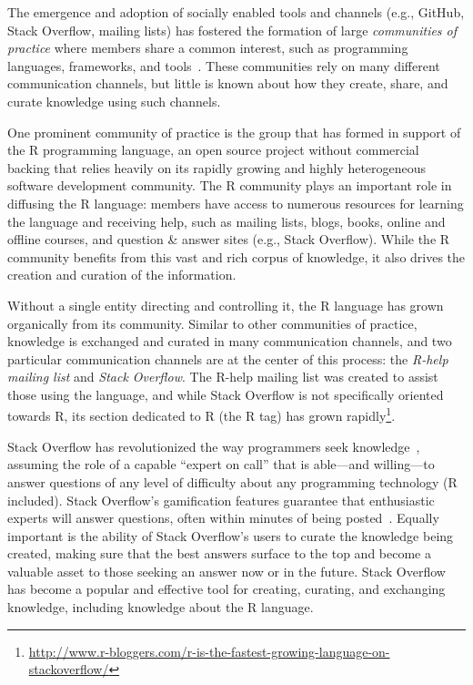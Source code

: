 \documentclass[smallextended]{svjour3}       %
\newcommand{\channels}{communication channels\xspace}
\newcommand{\SO}{Stack Overflow\xspace}
\newcommand{\RH}{R-help\xspace}
\begin{document}
The emergence and adoption of socially enabled tools and channels
(e.g., GitHub, \SO, mailing lists) has fostered the formation of large
\textit{communities of practice} where members share a common
interest, such as programming languages, frameworks, and
tools~\cite{Storey2014}. These communities rely on many
different communication channels, but little is known about how
they create, share, and curate knowledge using such channels.

One prominent community of practice is the group that has formed in support of the R
programming language, an open source project without commercial
backing that relies heavily on its rapidly growing and highly
heterogeneous software development community. The R community plays an
important role in diffusing the R language: members have access to
numerous resources for learning the language and receiving help, such
as mailing lists, blogs, books, online and offline courses, and
question \& answer sites (e.g., \SO). While the R community benefits
from this vast and rich corpus of knowledge, it also drives the
creation and curation of the information.

Without a single entity directing and controlling it, the R language has grown organically from its community. Similar to other communities of practice, knowledge is exchanged and curated in many \channels, and two particular \channels are at the center of this process: the \textit{\RH mailing list} and \textit{\SO}. The \RH mailing list was created to assist those using the language, and while \SO is not specifically oriented towards R, its section dedicated to R (the R tag) has grown rapidly\footnote{\href{http://www.r-bloggers.com/r-is-the-fastest-growing-language-on-stackoverflow/}{http://www.r-bloggers.com/r-is-the-fastest-growing-language-on-stackoverflow/}}.

\SO has revolutionized the way programmers seek knowledge~\cite{li2013help,Vasilescu2014c}, assuming the role of a capable ``expert on call'' that is able---and willing---to answer questions of any level of difficulty about any programming technology (R included). \SO's gamification features guarantee that enthusiastic experts will answer questions, often within minutes of being posted~\cite{Mamykina2011}. Equally important is the ability of \SO's users to curate the knowledge being created, making sure that the best answers surface to the top and become a valuable asset to those seeking an answer now or in the future. \SO has become a popular and effective tool for creating, curating, and exchanging knowledge, including knowledge about the R language.
\end{document}

